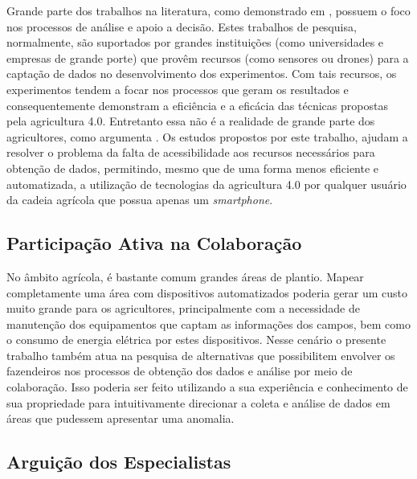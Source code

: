 \documentclass[12pt]{article}
\begin{document}
Grande parte dos trabalhos na literatura, como demonstrado em \cite{Massruha:2017}, possuem o foco nos processos de análise e apoio a decisão. Estes trabalhos de pesquisa, normalmente, são suportados por grandes instituições (como universidades e empresas de grande porte) que provêm recursos (como sensores ou drones) para a captação de dados no desenvolvimento dos experimentos. Com tais recursos, os experimentos tendem a focar nos processos que geram os resultados e consequentemente demonstram a eficiência e a eficácia das técnicas propostas pela agricultura 4.0. Entretanto essa não é a realidade de grande parte dos agricultores, como argumenta \cite{Rose:2019}. Os estudos propostos por este trabalho, ajudam a resolver o problema da falta de acessibilidade aos recursos necessários para obtenção de dados, permitindo, mesmo que de uma forma menos eficiente e automatizada, a utilização de tecnologias da agricultura 4.0 por qualquer usuário da cadeia agrícola que possua apenas um \textit{smartphone}.

\subsection{Participação Ativa na Colaboração}
\label{subsec:participacao_ativa_colaboracao}

No âmbito agrícola, é bastante comum grandes áreas de plantio. Mapear completamente uma área com dispositivos automatizados poderia gerar um custo muito grande para os agricultores, principalmente com a necessidade de manutenção dos equipamentos que captam as informações dos campos, bem como o consumo de energia elétrica por estes dispositivos. Nesse cenário o presente trabalho também atua na pesquisa de alternativas que possibilitem envolver os fazendeiros nos processos de obtenção dos dados e análise por meio de colaboração. Isso poderia ser feito utilizando a sua experiência e conhecimento de sua propriedade para intuitivamente direcionar a coleta e análise de dados em áreas que pudessem apresentar uma anomalia.

\subsection{Arguição dos Especialistas}
\label{subsec:arquicao_especialistas}
\end{document}

